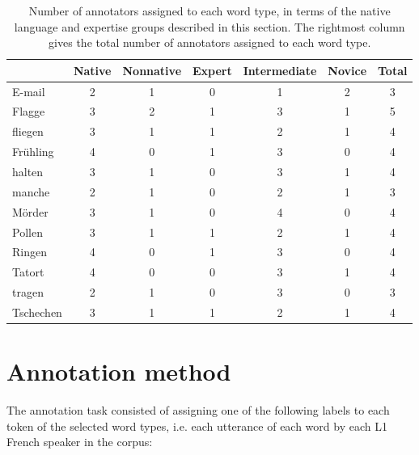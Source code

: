 	\begin{table}[p]
		\centering
		\caption[Number of annotators assigned to each word type]{Number of annotators assigned to each word type, in terms of the native language and expertise groups described in this section. The rightmost column gives the total number of annotators assigned to each word type.}
		\begin{tabular}{lcccccc}
		\toprule
		&		Native %
		& 	Nonnative %
		& Expert
		& Intermediate
		& Novice
		& Total %
		\\
		\midrule
		E-mail			& 2 	& 1 	&	0	&	1	&	2	& 3 \\
		Flagge			& 3	& 2	&	1	&	3	&	1	& 5 \\
		fliegen			& 3	& 1	&	1	&	2	&	1	& 4 \\
		Frühling		& 4	& 0	&	1	&	3	&	0	& 4 \\
		halten			& 3	& 1	&	0	&	3	&	1	& 4 \\
		manche		& 2	& 1	&	0	&	2	&	1	& 3 \\
		Mörder 		& 3	& 1	&	0	&	4	&	0	& 4 \\
		Pollen			& 3	& 1	&	1	&	2	&	1	& 4 \\
		Ringen			& 4	& 0	&	1	&	3	&	0	& 4 \\
		Tatort			& 4	& 0	&	0	&	3	&	1	& 4 \\
		tragen			& 2	& 1	&	0	&	3	&	0	& 3 \\
		Tschechen 	& 3	& 1	&	1	&	2	&	1	& 4 \\
		\bottomrule
		\end{tabular}
		\label{tab:annotatorsbyword}
	\end{table}
	
	
	
	\section{Annotation method}
	\label{sec:lexstress:method}

	The annotation task consisted of assigning one of the following labels to 
	each token of the selected word types, i.e. each utterance of each word by each L1 French speaker in the corpus:
	
